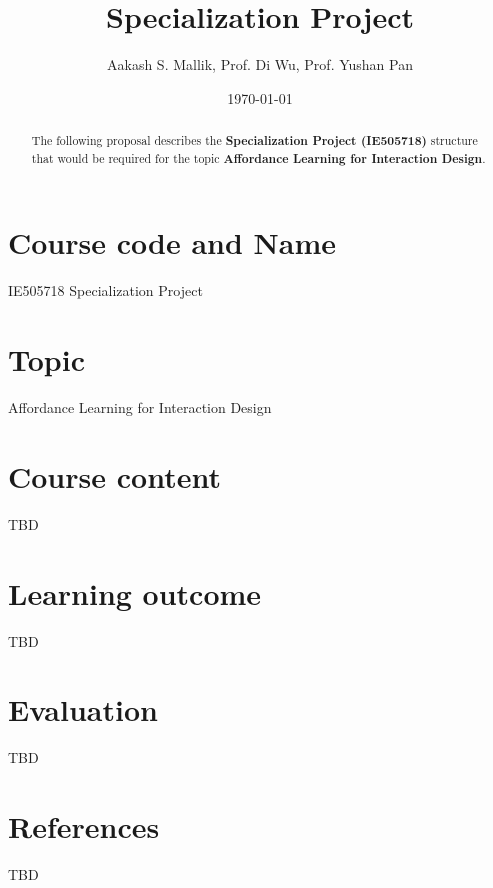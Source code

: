 \documentclass[letterpaper,12pt]{article}
\begin{document}
\title{Specialization Project}
\author{Aakash S. Mallik, Prof. Di Wu, Prof. Yushan Pan}
\date{\today}
\maketitle

\begin{abstract}
The following proposal describes the 
\textbf{Specialization Project (IE505718)} structure that would be required for the topic \textbf{Affordance Learning for Interaction Design}.
\end{abstract}


\section{Course code and Name}

IE505718 Specialization Project

\section{Topic}

Affordance Learning for Interaction Design

\section{Course content}

TBD

\section{Learning outcome}

TBD

\section{Evaluation}

TBD

\section{References}

TBD
\end{document}
